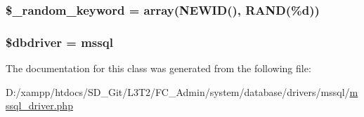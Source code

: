 \subsubsection[{\$\+\_\+random\+\_\+keyword}]{\setlength{\rightskip}{0pt plus 5cm}\$\+\_\+random\+\_\+keyword = array(\textquotesingle{}N\+E\+W\+I\+D()\textquotesingle{}, \textquotesingle{}R\+A\+N\+D(\%{\bf d})\textquotesingle{})\hspace{0.3cm}{\ttfamily [protected]}}\label{class_c_i___d_b__mssql__driver_a10213aa6e05f6d924d3277bb1d2fea00}
\hypertarget{class_c_i___d_b__mssql__driver_a0cde2a16322a023d040aa7f725877597}{}
\subsubsection[{\$dbdriver}]{\setlength{\rightskip}{0pt plus 5cm}\$dbdriver = \textquotesingle{}mssql\textquotesingle{}}\label{class_c_i___d_b__mssql__driver_a0cde2a16322a023d040aa7f725877597}


The documentation for this class was generated from the following file\+:\begin{DoxyCompactItemize}
\item 
D\+:/xampp/htdocs/\+S\+D\+\_\+\+Git/\+L3\+T2/\+F\+C\+\_\+\+Admin/system/database/drivers/mssql/\hyperlink{mssql__driver_8php}{mssql\+\_\+driver.\+php}\end{DoxyCompactItemize}
